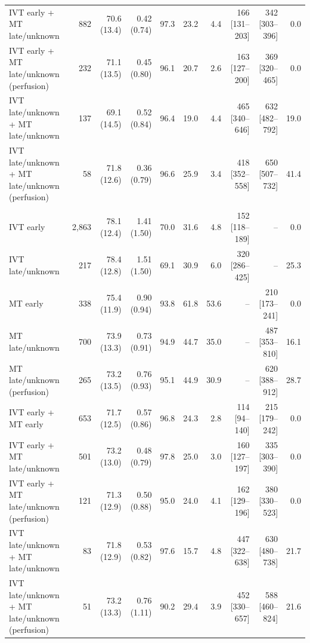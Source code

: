 \begin{landscape}
\begin{longtable}{p{5.6cm}rrrrrrrrr}
IVT early + MT late/unknown & 882 & 70.6 (13.4) & 0.42 (0.74) & 97.3 & 23.2 & 4.4 & 166 [131--203] & 342 [303--396] & 0.0 \\
IVT early + MT late/unknown (perfusion) & 232 & 71.1 (13.5) & 0.45 (0.80) & 96.1 & 20.7 & 2.6 & 163 [127--200] & 369 [320--465] & 0.0 \\
IVT late/unknown + MT late/unknown & 137 & 69.1 (14.5) & 0.52 (0.84) & 96.4 & 19.0 & 4.4 & 465 [340--646] & 632 [482--792] & 19.0 \\
IVT late/unknown + MT late/unknown (perfusion) & 58 & 71.8 (12.6) & 0.36 (0.79) & 96.6 & 25.9 & 3.4 & 418 [352--558] & 650 [507--732] & 41.4 \\
\addlinespace
\multicolumn{10}{l}{\textbf{NIHSS 21--25}}\\
IVT early & 2,863 & 78.1 (12.4) & 1.41 (1.50) & 70.0 & 31.6 & 4.8 & 152 [118--189] & -- & 0.0 \\
IVT late/unknown & 217 & 78.4 (12.8) & 1.51 (1.50) & 69.1 & 30.9 & 6.0 & 320 [286--425] & -- & 25.3 \\
MT early & 338 & 75.4 (11.9) & 0.90 (0.94) & 93.8 & 61.8 & 53.6 & -- & 210 [173--241] & 0.0 \\
MT late/unknown & 700 & 73.9 (13.3) & 0.73 (0.91) & 94.9 & 44.7 & 35.0 & -- & 487 [353--810] & 16.1 \\
MT late/unknown (perfusion) & 265 & 73.2 (13.5) & 0.76 (0.93) & 95.1 & 44.9 & 30.9 & -- & 620 [388--912] & 28.7 \\
IVT early + MT early & 653 & 71.7 (12.5) & 0.57 (0.86) & 96.8 & 24.3 & 2.8 & 114 [94--140] & 215 [179--242] & 0.0 \\
IVT early + MT late/unknown & 501 & 73.2 (13.0) & 0.48 (0.79) & 97.8 & 25.0 & 3.0 & 160 [127--197] & 335 [303--390] & 0.0 \\
IVT early + MT late/unknown (perfusion) & 121 & 71.3 (12.9) & 0.50 (0.88) & 95.0 & 24.0 & 4.1 & 162 [129--196] & 380 [330--523] & 0.0 \\
IVT late/unknown + MT late/unknown & 83 & 71.8 (12.9) & 0.53 (0.82) & 97.6 & 15.7 & 4.8 & 447 [322--638] & 630 [480--738] & 21.7 \\
IVT late/unknown + MT late/unknown (perfusion) & 51 & 73.2 (13.3) & 0.76 (1.11) & 90.2 & 29.4 & 3.9 & 452 [330--657] & 588 [460--824] & 21.6 \\
\end{longtable}
\vspace{-0.5\baselineskip}
\end{landscape}

